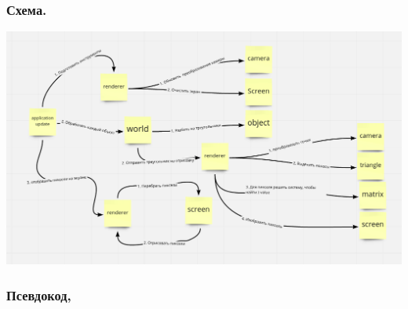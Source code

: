 \documentclass{article}
\begin{document}
\subsubsection{Схема.}

\begin{center}
\includegraphics[width=15cm]{scheme_pipeline.png}
\end{center}


\subsubsection{Псевдокод,}
\end{document}
